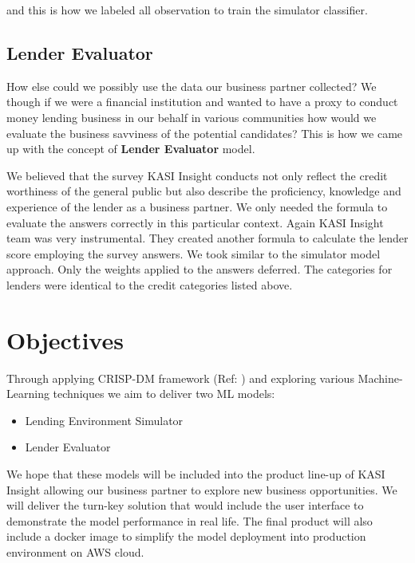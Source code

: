 and this is how we labeled all observation to train the simulator
classifier.

\hypertarget{lender-evaluator}{%
\subsection{Lender Evaluator}\label{lender-evaluator}}

How else could we possibly use the data our business partner collected?
We though if we were a financial institution and wanted to have a proxy
to conduct money lending business in our behalf in various communities
how would we evaluate the business savviness of the potential
candidates? This is how we came up with the concept of \textbf{Lender
Evaluator} model.

We believed that the survey KASI Insight conducts not only reflect the
credit worthiness of the general public but also describe the
proficiency, knowledge and experience of the lender as a business
partner. We only needed the formula to evaluate the answers correctly in
this particular context. Again KASI Insight team was very instrumental.
They created another formula to calculate the lender score employing the
survey answers. We took similar to the simulator model approach. Only
the weights applied to the answers deferred. The categories for lenders
were identical to the credit categories listed above.

\hypertarget{objectives}{%
\section{Objectives}\label{objectives}}

Through applying CRISP-DM framework (Ref: \cite{mining}) and exploring
various Machine-Learning techniques we aim to deliver two ML models:

\begin{itemize}
\item
  Lending Environment Simulator
\item
  Lender Evaluator
\end{itemize}

We hope that these models will be included into the product line-up of
KASI Insight allowing our business partner to explore new business
opportunities. We will deliver the turn-key solution that would include
the user interface to demonstrate the model performance in real life.
The final product will also include a docker image to simplify the model
deployment into production environment on AWS cloud.


